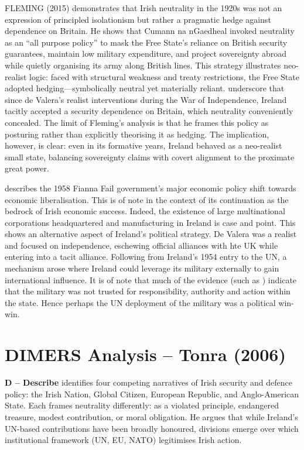 \nocite{FLEMING_2015} FLEMING (2015) demonstrates that Irish neutrality in the 1920s was not an expression of principled isolationism but rather a pragmatic hedge against dependence on Britain. He shows that Cumann na nGaedheal invoked neutrality as an “all purpose policy” to mask the Free State’s reliance on British security guarantees, maintain low military expenditure, and project sovereignty abroad while quietly organising its army along British lines. This strategy illustrates neo-realist logic: faced with structural weakness and treaty restrictions, the Free State adopted hedging—symbolically neutral yet materially reliant. \parencite{FANNING_2015,AYIOTIS_2023} underscore that since de Valera’s realist interventions during the War of Independence, Ireland tacitly accepted a security dependence on Britain, which neutrality conveniently concealed. The limit of Fleming’s analysis is that he frames this policy as posturing rather than explicitly theorising it as hedging. The implication, however, is clear: even in its formative years, Ireland behaved as a neo-realist small state, balancing sovereignty claims with covert alignment to the proximate great power.

\parencite[pp. 125--128]{TONRA_2006} describes the 1958 Fianna Fail government's  major economic policy shift towards economic liberalisation. This is of note in the context of its continuation as the bedrock of Irish economic success. Indeed, the existence of large multinational corporations headquartered and manufacturing in Ireland is case and point. This shows an alternative aspect of Ireland's political strategy. De Valera was a realist and focused on independence, eschewing official alliances with hte UK while entering into a tacit alliance. Following from Ireland's 1954 entry to the UN, a mechanism arose where Ireland could leverage its military externally to gain international influence. It is of note that much of the evidence (such as \parencite{AYIOTIS_2023}) indicate that the military was not trusted for responsibility, authority and action within the state. Hence perhaps the UN deployment of the military was a political win-win.

\section*{DIMERS Analysis – Tonra (2006)}

\textbf{D – Describe}  
\parencite{TONRA_2006} identifies four competing narratives of Irish security and defence policy: the Irish Nation, Global Citizen, European Republic, and Anglo-American State. Each frames neutrality differently: as a violated principle, endangered treasure, modest contribution, or moral obligation. He argues that while Ireland’s UN-based contributions have been broadly honoured, divisions emerge over which institutional framework (UN, EU, NATO) legitimises Irish action.  

